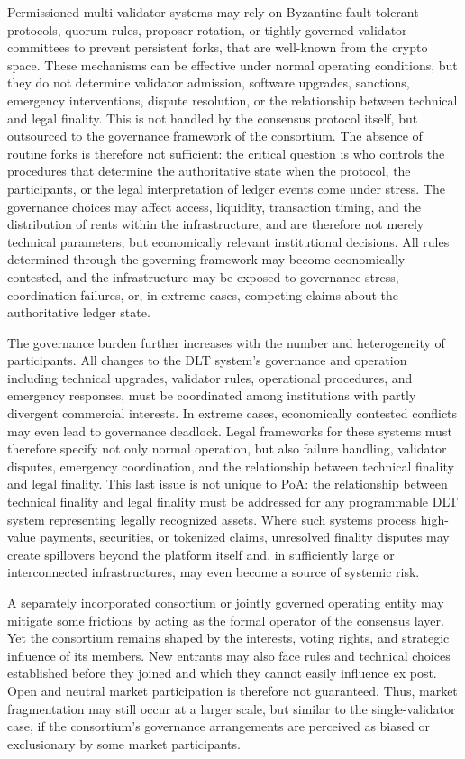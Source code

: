 \documentclass[
reprint,
showkeys,
superscriptaddress,
aps,
pra,
longbibliography,
nofootinbib,
]{revtex4-2}
\theoremstyle{definition}\newtheorem{definition}{Definition}
\begin{document}
Permissioned multi-validator systems may rely on Byzantine-fault-tolerant protocols, quorum rules, proposer rotation, or tightly governed validator committees to prevent persistent forks, that are well-known from the crypto space.
These mechanisms can be effective under normal operating conditions, but they do not determine validator admission, software upgrades, sanctions, emergency interventions, dispute resolution, or the relationship between technical and legal finality. 
This is not handled by the consensus protocol itself, but outsourced to the governance framework of the consortium.
The absence of routine forks is therefore not sufficient: the critical question is who controls the procedures that determine the authoritative state when the protocol, the participants, or the legal interpretation of ledger events come under stress.
The governance choices may affect access, liquidity, transaction timing, and the distribution of rents within the infrastructure, and are therefore not merely technical parameters, but economically relevant institutional decisions.
All rules determined through the governing framework may become economically contested, and the infrastructure may be exposed to governance stress, coordination failures, or, in extreme cases, competing claims about the authoritative ledger state.


The governance burden further increases with the number and heterogeneity of participants.
All changes to the DLT system's governance and operation including technical upgrades, validator rules, operational procedures, and emergency responses, must be coordinated among institutions with partly divergent commercial interests.
In extreme cases, economically contested conflicts may even lead to governance deadlock.
Legal frameworks for these systems must therefore specify not only normal operation, but also failure handling, validator disputes, emergency coordination, and the relationship between technical finality and legal finality.
This last issue is not unique to PoA: the relationship between technical finality and legal finality must be addressed for any programmable DLT system representing legally recognized assets.
Where such systems process high-value payments, securities, or tokenized claims, unresolved finality disputes may create spillovers beyond the platform itself and, in sufficiently large or interconnected infrastructures, may even become a source of systemic risk.


A separately incorporated consortium or jointly governed operating entity may mitigate some frictions by acting as the formal operator of the consensus layer. 
Yet the consortium remains shaped by the interests, voting rights, and strategic influence of its members. 
New entrants may also face rules and technical choices established before they joined and which they cannot easily influence ex post.
Open and neutral market participation is therefore not guaranteed.
Thus, market fragmentation may still occur at a larger scale, but similar to the single-validator case, if the consortium's governance arrangements are perceived as biased or exclusionary by some market participants.
\end{document}
